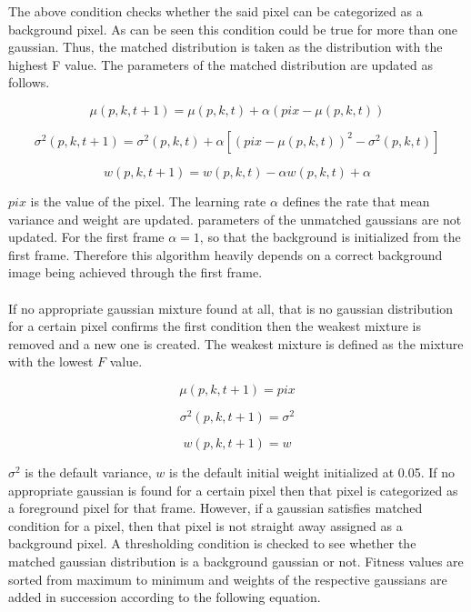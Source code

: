 \documentclass[12pt,a4paper]{report}
\begin{document}
The above condition checks whether the said pixel can be categorized as a background pixel. As can be seen this condition could be true for more than one gaussian. Thus, the matched distribution is taken as the distribution with the highest F value. The parameters of the matched distribution are updated as follows. 

\begin{equation}
 \mu(p,k,t+1)=  \mu(p,k,t)+ \alpha(pix- \mu(p,k,t))  
\end{equation}

\begin{equation}
\sigma^2(p,k,t+1)= \sigma^2(p,k,t)+\alpha[(pix- \mu(p,k,t))^2-\sigma^2(p,k,t)]
\end{equation}

\begin{equation}
 w(p,k,t+1)=  w(p,k,t)- \alpha w(p,k,t)+\alpha
\end{equation}

$pix$ is the value of the pixel. The learning rate $\alpha$ defines the rate that mean variance and weight are updated. parameters of the unmatched gaussians are not updated. For the first frame $\alpha = 1$, so that the background is initialized from the first frame.  Therefore this algorithm heavily depends on a correct background image being achieved through the first frame.\\\\
If no appropriate gaussian mixture found at all, that is no gaussian distribution for a certain pixel confirms the first condition then the weakest mixture is removed and a new one is created. The weakest mixture is defined as the mixture with the lowest $F$ value.

\begin{equation}
 \mu(p,k,t+1)=  pix
\end{equation}

\begin{equation}
\sigma^2(p,k,t+1)= \sigma^2
\end{equation}

\begin{equation}
 w(p,k,t+1)=w
\end{equation}

$\sigma^2$  is the default variance, $w$ is the default initial weight initialized at 0.05. If no appropriate gaussian is found for a certain pixel then that pixel is categorized as a foreground pixel for that frame. However, if a gaussian satisfies matched condition for a pixel, then that pixel is not straight away assigned as a background pixel. A thresholding condition is checked to see whether the matched gaussian distribution is a background gaussian or not. Fitness values are sorted from maximum to minimum and weights of the respective gaussians are added in succession according to the following equation.
\end{document}
